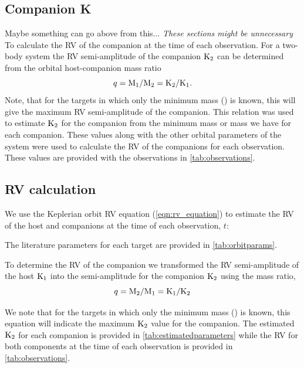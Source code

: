 \subsection{Companion K}  Maybe something can go above from this...
\label{sec:companion_RV}
\emph{These sections might be unnecessary}\\

To calculate the {RV} of the companion at the time of each observation.
For a two-body system the {RV} semi-amplitude of the companion \(\textrm{K}_{2}\) can be determined from the orbital host-companion mass ratio
\begin{equation}
q = \textrm{M}_{1}/\textrm{M}_{2} = \textrm{K}_{2}/\textrm{K}_{1}\label{eqn:q_ratio_K2}.
\end{equation}
Note, that for the targets in which only the minimum mass (\Mtwosini) is known, this will give the maximum {RV} semi-amplitude of the companion.
This relation was used to estimate \(\textrm{K}_{2}\) for the companion from the minimum mass or mass we have for each companion.
These values along with the other orbital parameters of the system were used to calculate the {RV} of the companions for each observation.
These values are provided with the observations in \cref{tab:observations}.




\subsection{{RV} calculation}
We use the Keplerian orbit {RV} equation (\cref{eqn:rv_equation}) to estimate the {RV} of the host and companions at the time of each observation, \(t\):

The literature parameters for each target are provided in \cref{tab:orbitparams}.


To determine the {RV} of the companion we transformed the {RV} semi-amplitude of the host \(\textrm{K}_{1}\) into the semi-amplitude for the companion \(\textrm{K}_{2}\) using the mass ratio,
\begin{equation}
\label{eqn:mass_ratio}
q = \textrm{M}_{2} / \textrm{M}_{1} = \textrm{K}_{1} / \textrm{K}_{2}
\end{equation}

We note that for the targets in which only the minimum mass (\Mtwosini) is known, this equation will indicate the maximum \(\textrm{K}_{2}\) value for the companion.
The estimated \(\textrm{K}_{2}\) for each companion is provided in \cref{tab:estimatedparameters} while the {RV} for both components at the time of each observation is provided in \cref{tab:observations}.








